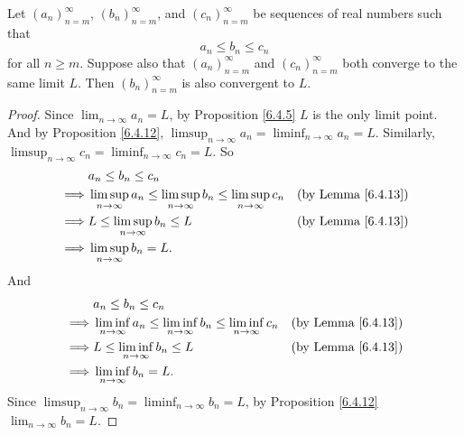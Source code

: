 \begin{corollary}\label{6.4.14}
    Let \((a_n)_{n = m}^\infty\), \((b_n)_{n = m}^\infty\), and \((c_n)_{n = m}^\infty\) be sequences of real numbers such that
    \[
        a_n \leq b_n \leq c_n
    \]
    for all \(n \geq m\).
    Suppose also that \((a_n)_{n = m}^\infty\) and \((c_n)_{n = m}^\infty\) both converge to the same limit \(L\).
    Then \((b_n)_{n = m}^\infty\) is also convergent to \(L\).
\end{corollary}

\begin{proof}
    Since \(\lim_{n \to \infty} a_n = L\), by Proposition \ref{6.4.5} \(L\) is the only limit point.
    And by Proposition \ref{6.4.12}, \(\limsup_{n \to \infty} a_n = \liminf_{n \to \infty} a_n = L\).
    Similarly, \(\limsup_{n \to \infty} c_n = \liminf_{n \to \infty} c_n = L\).
    So
    \begin{align*}
                 & a_n \leq b_n \leq c_n                                                                                                          \\
        \implies & \limsup_{n \to \infty} a_n \leq \limsup_{n \to \infty} b_n \leq \limsup_{n \to \infty} c_n & \text{(by Lemma \ref{6.4.13})} \\
        \implies & L \leq \limsup_{n \to \infty} b_n \leq L                                                     & \text{(by Lemma \ref{6.4.13})} \\
        \implies & \limsup_{n \to \infty} b_n = L.
    \end{align*}
    And
    \begin{align*}
                 & a_n \leq b_n \leq c_n                                                                                                          \\
        \implies & \liminf_{n \to \infty} a_n \leq \liminf_{n \to \infty} b_n \leq \liminf_{n \to \infty} c_n & \text{(by Lemma \ref{6.4.13})} \\
        \implies & L \leq \liminf_{n \to \infty} b_n \leq L                                                     & \text{(by Lemma \ref{6.4.13})} \\
        \implies & \liminf_{n \to \infty} b_n = L.
    \end{align*}
    Since \(\limsup_{n \to \infty} b_n = \liminf_{n \to \infty} b_n = L\), by Proposition \ref{6.4.12} \(\lim_{n \to \infty} b_n = L\).
\end{proof}

